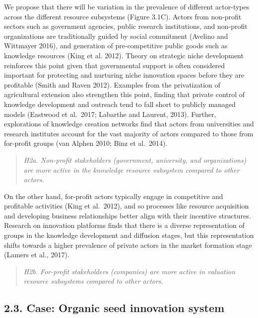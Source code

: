 \documentclass[twoside,12pt,final]{ucthesis-CA2012}
\begin{document}
\begin{ucmainmatter}
We propose that there will be variation in the prevalence of different
actor-types across the different resource subsystems (Figure 3.1C).
Actors from non-profit sectors such as government agencies, public
research institutions, and non-profit organizations are traditionally
guided by social commitment (Avelino and Wittmayer 2016), and generation
of pre-competitive public goods such as knowledge resources (King et al.
2012). Theory on strategic niche development reinforces this point given
that governmental support is often considered important for protecting
and nurturing niche innovation spaces before they are profitable (Smith
and Raven 2012). Examples from the privatization of agricultural
extension also strengthen this point, finding that private control of
knowledge development and outreach tend to fall short to publicly
managed models (Eastwood et al.~2017; Labarthe and Laurent, 2013).
Further, explorations of knowledge creation networks find that actors
from universities and research institutes account for the vast majority
of actors compared to those from for-profit groups (van Alphen 2010;
Binz et al.~2014).
\begin{quote}
\emph{H2a. Non-profit stakeholders (government, university, and
organizations) are more active in the knowledge resource subsystem
compared to other actors.}
\end{quote}
On the other hand, for-profit actors typically engage in competitive and
profitable activities (King et al.~2012), and so processes like resource
acquisition and developing business relationships better align with
their incentive structures. Research on innovation platforms finds that
there is a diverse representation of groups in the knowledge development
and diffusion stages, but this representation shifts towards a higher
prevalence of private actors in the market formation stage (Lamers et
al., 2017).
\begin{quote}
\emph{H2b. For-profit stakeholders (companies) are more active in valuation
resource subsystems compared to other actors.}
\end{quote}
\hypertarget{case-organic-seed-innovation-system}{%
\subsection{2.3. Case: Organic seed innovation system}\label{case-organic-seed-innovation-system}}


\end{ucmainmatter}
\end{document}
